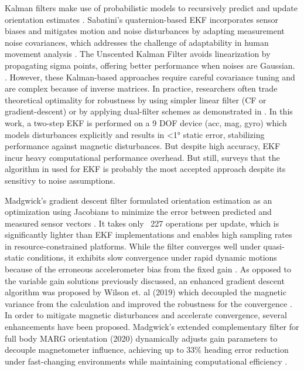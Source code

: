 \documentclass{iutbscthesis}
\begin{document}
Kalman filters make use of probabilistic models to recursively predict and update orientation estimates \cite{EKF}. Sabatini’s quaternion-based EKF incorporates sensor biases and mitigates motion and noise disturbances by adapting measurement noise covariances, which addresses the challenge of adaptability in human movement analysis \cite{quatEKF}. The Unscented Kalman Filter avoids linearization by propagating sigma points, offering better performance when noises are Gaussian. \cite{UKF}. However, these Kalman-based approaches require careful covariance tuning and are complex because of inverse matrices. In practice, researchers often trade theoretical optimality for robustness by using simpler linear filter (CF or gradient-descent) or by applying dual-filter schemes as demonstrated in \cite{doubleEKF}. In this work, a two-step EKF is performed on a 9 DOF  device (acc, mag, gyro) which models disturbances explicitly and results in <1° static error, stabilizing performance against magnetic disturbances. But despite high accuracy, EKF incur heavy computational performance overhead. But still, \cite{vertzberger2022adaptive} surveys that the algorithm in \cite{quest} used for EKF \cite{EKF} is probably the most accepted approach despite its sensitivy to noise assumptions. 

Madgwick’s gradient descent filter formulated orientation estimation as an optimization using Jacobians to minimize the error between predicted and measured sensor vectors \cite{madgwick2011estimation}. It takes only ~227 operations per update, which is significantly lighter than EKF implementations and enables high sampling rates in resource-constrained platforms. While the filter converges well under quasi-static conditions, it exhibits slow convergence under rapid dynamic motions because of the erroneous accelerometer bias from the fixed gain \cite{bettermadg}. As opposed to the variable gain solutions previously discussed, an enhanced gradient descent algorithm was proposed by Wilson et. al (2019) which decoupled the magnetic variance from the calculation and improved the robustness for the convergence \cite{bettermadg}. In order to mitigate magnetic disturbances and accelerate convergence, several enhancements have been proposed. Madgwick’s extended complementary filter for full body MARG orientation (2020) dynamically adjusts gain parameters to decouple magnetometer influence, achieving up to 33\% heading error reduction under fast-changing environments while maintaining computational efficiency \cite{extendedMADG}.
\end{document}
